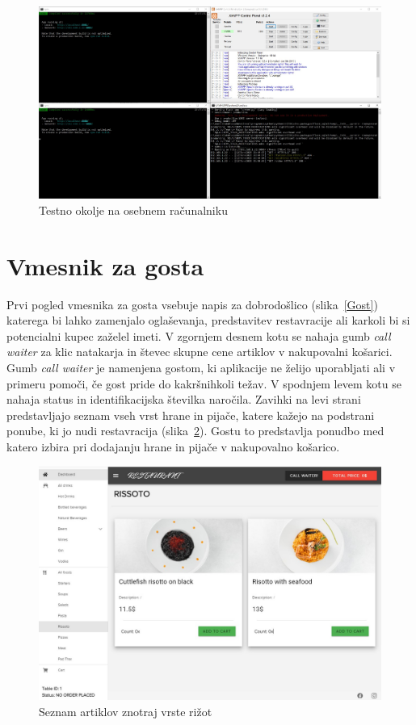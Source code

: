 \documentclass[a4paper, 12pt]{book}
\begin{document}
\begin{figure}[!htb]
\begin{center}
\includegraphics[width=14cm]{Programi.jpg}
\caption{Testno okolje na osebnem računalniku}
\label{Program1}
\end{center}
\end{figure}


\section{Vmesnik za gosta}
Prvi pogled vmesnika za gosta vsebuje napis za dobrodošlico (slika~\ref{Gost}) katerega bi lahko zamenjalo oglaševanja, predstavitev restavracije ali karkoli bi si potencialni kupec zaželel imeti. V zgornjem desnem kotu se nahaja gumb \textit{call waiter} za klic natakarja in števec skupne cene artiklov v nakupovalni košarici. Gumb \textit{call waiter} je namenjena gostom, ki aplikacije ne želijo uporabljati ali v primeru pomoči, če gost pride do kakršnihkoli težav. V spodnjem levem kotu se nahaja status in identifikacijska številka naročila. 
Zavihki na levi strani predstavljajo seznam vseh vrst hrane in pijače, katere kažejo na podstrani ponube, ki jo nudi restavracija (slika~\ref{Gost_3}). Gostu to predstavlja ponudbo med katero izbira pri dodajanju hrane in pijače v nakupovalno košarico.


\begin{figure}[!htb]
\begin{center}
\includegraphics[width=13.7cm]{customer_1.jpg}
\caption{Seznam artiklov znotraj vrste rižot}
\label{Gost_3}
\end{center}
\end{figure}
\end{document}
